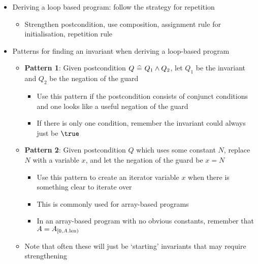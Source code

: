 \begin{itemize}
	
	\item Deriving a loop based program: follow the strategy for repetition
	
	\begin{itemize}
		\item Strengthen postcondition, use composition, assignment rule for initialisation, repetition rule
	\end{itemize}
	
	\item Patterns for finding an invariant when deriving a loop-based program
	
	\begin{itemize}
		
		\item \textbf{Pattern 1}: Given postcondition $ Q ~ \widehat{=} ~ Q_1 \land Q_2 $, let $ Q_1 $ be the invariant and $ Q_2 $ be the negation of the guard
		
		\begin{itemize}
			
			\item Use this pattern if the postcondition consists of conjunct conditions and one looks like a useful negation of the guard
			
			\item If there is only one condition, remember the invariant could always just be $ \true $
			
		\end{itemize}
		
		\item \textbf{Pattern 2}: Given postcondition $ Q $ which uses some constant $ N $, replace $ N $ with a variable $ x $, and let the negation of the guard be $ x = N $
		
		\begin{itemize}
			
			\item Use this pattern to create an iterator variable $ x $ when there is something clear to iterate over
			
			\item This is commonly used for array-based programs
			
			\item In an array-based program with no obvious constants, remember that $ A = {A}_{\left[{0},{A.\text{len}}\right)} $
			
		\end{itemize}
	
		\item Note that often these will just be `starting' invariants that may require strengthening
		
	\end{itemize}
	
\end{itemize}